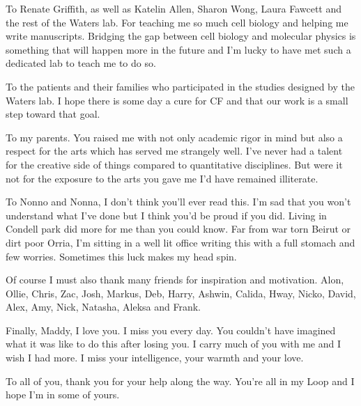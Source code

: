 To Renate Griffith, as well as Katelin Allen, Sharon Wong, Laura Fawcett and the rest of the Waters lab. For teaching me so much cell biology and helping me write manuscripts. Bridging the gap between cell biology and molecular physics is something that will happen more in the future and I'm lucky to have met such a dedicated lab to teach me to do so.

To the patients and their families who participated in the studies designed by the Waters lab. I hope there is some day a cure for CF and that our work is a small step toward that goal.

To my parents. You raised me with not only academic rigor in mind but also a respect for the arts which has served me strangely well. I've never had a talent for the creative side of things compared to quantitative disciplines. But were it not for the exposure to the arts you gave me I'd have remained illiterate. 

To Nonno and Nonna, I don't think you'll ever read this. I'm sad that you won't understand what I've done but I think you'd be proud if you did. Living in Condell park did more for me than you could know. Far from war torn Beirut or dirt poor Orria, I'm sitting in a well lit office writing this with a full stomach and few worries. Sometimes this luck makes my head spin. 

Of course I must also thank many friends for inspiration and motivation. Alon, Ollie, Chris, Zac, Josh, Markus, Deb, Harry, Ashwin, Calida, Hway, Nicko, David, Alex, Amy, Nick, Natasha, Aleksa and Frank.

Finally, Maddy, I love you. I miss you every day. You couldn't have imagined what it was like to do this after losing you. I carry much of you with me and I wish I had more. I miss your intelligence, your warmth and your love.

To all of you, thank you for your help along the way. You're all in my Loop \cite{hofstadter2007} and I hope I'm in some of yours.

